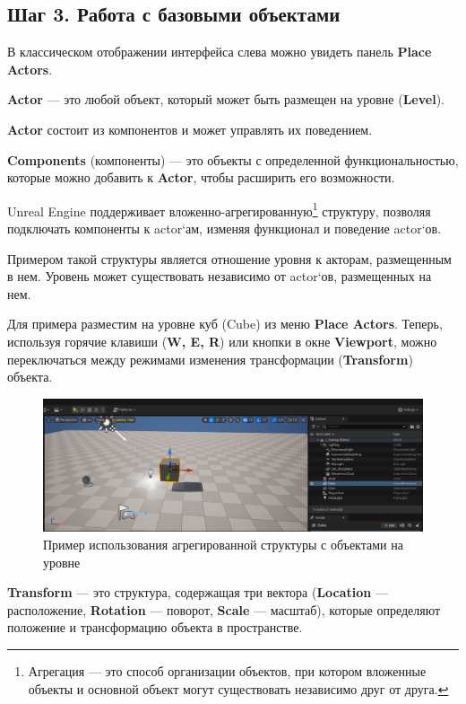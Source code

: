 \newpage

\subsection{Шаг 3. Работа с базовыми объектами}

В классическом отображении интерфейса слева можно увидеть панель \textbf{Place Actors}.

\textbf{Actor} — это любой объект, который может быть размещен на уровне (\textbf{Level}).

\textbf{Actor} состоит из компонентов и может управлять их поведением.

\textbf{Components} (компоненты) — это объекты с определенной функциональностью, которые можно добавить к \textbf{Actor}, чтобы расширить его возможности.

Unreal Engine поддерживает вложенно-агрегированную\footnote{Агрегация — это способ организации объектов, при котором вложенные объекты и основной объект могут существовать независимо друг от друга.} структуру, позволяя подключать компоненты к actor`ам, изменяя функционал и поведение actor`ов.

Примером такой структуры является отношение уровня к акторам, размещенным в нем. Уровень может существовать независимо от actor`ов, размещенных на нем.

Для примера разместим на уровне куб (Cube) из меню \textbf{Place Actors}. Теперь, используя горячие клавиши (\textbf{W, E, R}) или кнопки в окне \textbf{Viewport}, можно переключаться между режимами изменения трансформации (\textbf{Transform}) объекта.

\begin{figure}[h]
    \centering
    \includegraphics[width=\textwidth]{Lections/LevelAgrigation.png}
    \caption{Пример использования агрегированной структуры с объектами на уровне}
\end{figure}


\textbf{Transform} — это структура, содержащая три вектора (\textbf{Location} — расположение, \textbf{Rotation} — поворот, \textbf{Scale} — масштаб), которые определяют положение и трансформацию объекта в пространстве.

